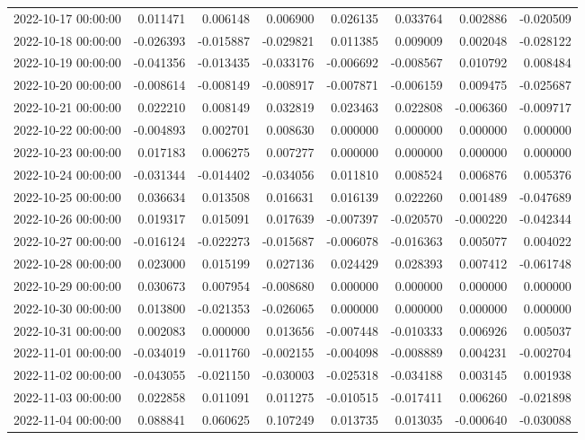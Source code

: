 \begin{tabular}{lrrrrrrr}
2022-10-17 00:00:00 & 0.011471 & 0.006148 & 0.006900 & 0.026135 & 0.033764 & 0.002886 & -0.020509 \\
2022-10-18 00:00:00 & -0.026393 & -0.015887 & -0.029821 & 0.011385 & 0.009009 & 0.002048 & -0.028122 \\
2022-10-19 00:00:00 & -0.041356 & -0.013435 & -0.033176 & -0.006692 & -0.008567 & 0.010792 & 0.008484 \\
2022-10-20 00:00:00 & -0.008614 & -0.008149 & -0.008917 & -0.007871 & -0.006159 & 0.009475 & -0.025687 \\
2022-10-21 00:00:00 & 0.022210 & 0.008149 & 0.032819 & 0.023463 & 0.022808 & -0.006360 & -0.009717 \\
2022-10-22 00:00:00 & -0.004893 & 0.002701 & 0.008630 & 0.000000 & 0.000000 & 0.000000 & 0.000000 \\
2022-10-23 00:00:00 & 0.017183 & 0.006275 & 0.007277 & 0.000000 & 0.000000 & 0.000000 & 0.000000 \\
2022-10-24 00:00:00 & -0.031344 & -0.014402 & -0.034056 & 0.011810 & 0.008524 & 0.006876 & 0.005376 \\
2022-10-25 00:00:00 & 0.036634 & 0.013508 & 0.016631 & 0.016139 & 0.022260 & 0.001489 & -0.047689 \\
2022-10-26 00:00:00 & 0.019317 & 0.015091 & 0.017639 & -0.007397 & -0.020570 & -0.000220 & -0.042344 \\
2022-10-27 00:00:00 & -0.016124 & -0.022273 & -0.015687 & -0.006078 & -0.016363 & 0.005077 & 0.004022 \\
2022-10-28 00:00:00 & 0.023000 & 0.015199 & 0.027136 & 0.024429 & 0.028393 & 0.007412 & -0.061748 \\
2022-10-29 00:00:00 & 0.030673 & 0.007954 & -0.008680 & 0.000000 & 0.000000 & 0.000000 & 0.000000 \\
2022-10-30 00:00:00 & 0.013800 & -0.021353 & -0.026065 & 0.000000 & 0.000000 & 0.000000 & 0.000000 \\
2022-10-31 00:00:00 & 0.002083 & 0.000000 & 0.013656 & -0.007448 & -0.010333 & 0.006926 & 0.005037 \\
2022-11-01 00:00:00 & -0.034019 & -0.011760 & -0.002155 & -0.004098 & -0.008889 & 0.004231 & -0.002704 \\
2022-11-02 00:00:00 & -0.043055 & -0.021150 & -0.030003 & -0.025318 & -0.034188 & 0.003145 & 0.001938 \\
2022-11-03 00:00:00 & 0.022858 & 0.011091 & 0.011275 & -0.010515 & -0.017411 & 0.006260 & -0.021898 \\
2022-11-04 00:00:00 & 0.088841 & 0.060625 & 0.107249 & 0.013735 & 0.013035 & -0.000640 & -0.030088 \\

\end{tabular}
